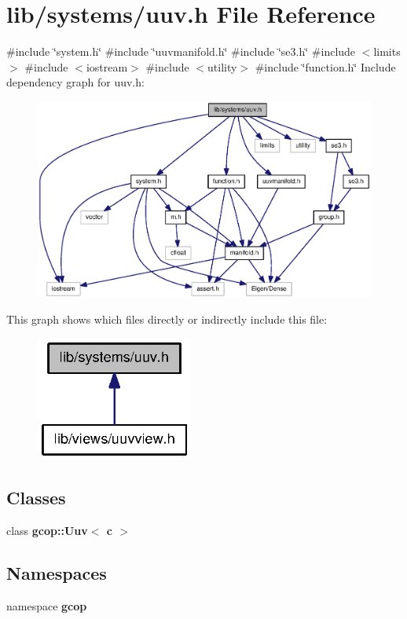 \section{lib/systems/uuv.h \-File \-Reference}
\label{uuv_8h}
{\ttfamily \#include \char`\"{}system.\-h\char`\"{}}\*
{\ttfamily \#include \char`\"{}uuvmanifold.\-h\char`\"{}}\*
{\ttfamily \#include \char`\"{}se3.\-h\char`\"{}}\*
{\ttfamily \#include $<$limits$>$}\*
{\ttfamily \#include $<$iostream$>$}\*
{\ttfamily \#include $<$utility$>$}\*
{\ttfamily \#include \char`\"{}function.\-h\char`\"{}}\*
\-Include dependency graph for uuv.\-h\-:
\nopagebreak
\begin{figure}[H]
\begin{center}
\leavevmode
\includegraphics[width=350pt]{uuv_8h__incl}
\end{center}
\end{figure}
\-This graph shows which files directly or indirectly include this file\-:
\nopagebreak
\begin{figure}[H]
\begin{center}
\leavevmode
\includegraphics[width=146pt]{uuv_8h__dep__incl}
\end{center}
\end{figure}
\subsection*{\-Classes}
\begin{DoxyCompactItemize}
\item 
class {\bf gcop\-::\-Uuv$<$ c $>$}
\end{DoxyCompactItemize}
\subsection*{\-Namespaces}
\begin{DoxyCompactItemize}
\item 
namespace {\bf gcop}
\end{DoxyCompactItemize}
